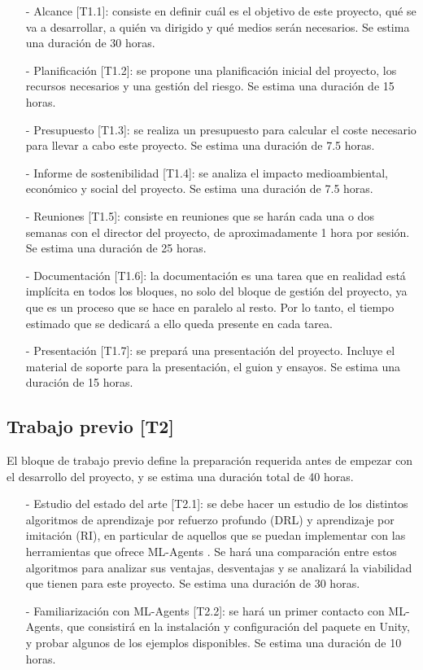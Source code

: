 \begin{enumerate}
    \item[-] Alcance [T1.1]: consiste en definir cuál es el objetivo de este proyecto, qué se va a desarrollar, a quién va dirigido y qué medios serán necesarios. Se estima una duración de 30 horas.
    \item[-] Planificación [T1.2]: se propone una planificación inicial del proyecto, los recursos necesarios y una gestión del riesgo. Se estima una duración de 15 horas.
    \item[-] Presupuesto [T1.3]: se realiza un presupuesto para calcular el coste necesario para llevar a cabo este proyecto. Se estima una duración de 7.5 horas.
    \item[-] Informe de sostenibilidad [T1.4]: se analiza el impacto medioambiental, económico y social del proyecto. Se estima una duración de 7.5 horas.
    \item[-] Reuniones [T1.5]: consiste en reuniones que se harán cada una o dos semanas con el director del proyecto, de aproximadamente 1 hora por sesión. Se estima una duración de 25 horas.
    \item[-] Documentación [T1.6]: la documentación es una tarea que en realidad está implícita en todos los bloques, no solo del bloque de gestión del proyecto, ya que es un proceso que se hace en paralelo al resto. Por lo tanto, el tiempo estimado que se dedicará a ello queda presente en cada tarea.
    \item[-] Presentación [T1.7]: se prepará una presentación del proyecto. Incluye el material de soporte para la presentación, el guion y ensayos. Se estima una duración de 15 horas.
    
\end{enumerate}

\subsection{Trabajo previo [T2]}
El bloque de trabajo previo define la preparación requerida antes de empezar con el desarrollo del proyecto, y se estima una duración total de 40 horas.


\begin{enumerate}
    \item[-] Estudio del estado del arte [T2.1]: se debe hacer un estudio de los distintos algoritmos de aprendizaje por refuerzo profundo (DRL) y aprendizaje por imitación (RI), en particular de aquellos que se puedan implementar con las herramientas que ofrece ML-Agents \cite{ml-agents-github}. Se hará una comparación entre estos algoritmos para analizar sus ventajas, desventajas y se analizará la viabilidad que tienen para este proyecto. Se estima una duración de 30 horas.
    \item[-] Familiarización con ML-Agents [T2.2]: se hará un primer contacto con ML-Agents, que consistirá en la instalación y configuración del paquete en Unity, y probar algunos de los ejemplos disponibles. Se estima una duración de 10 horas.
\end{enumerate}

